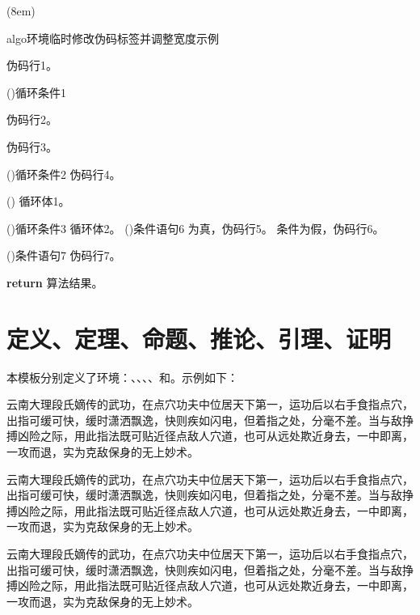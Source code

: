 \documentclass[print, doctor, vlined]{DissertUESTC}
\begin{document}
	\begin{algo}[!h](8em)
		\renewcommand{\algorithmcfname}{过程}  %
		\caption{algo环境临时修改伪码标签并调整宽度示例} \label{alg: algo环境修改伪码标签并调整宽度示例}
		伪码行1。
		
		\For(){循环条件1}{
			伪码行2。
			
			伪码行3。
			
			\DoWhile(){循环条件2}{
				伪码行4。
			}
			
			\Loop(){
				循环体1。
			}
			
			\Repeat(){循环条件3}{
				循环体2。
			}
			\eIf(){条件语句6}{
				为真，伪码行5。
			}{
				条件为假，伪码行6。
			}
			
			\If(){条件语句7}{
				伪码行7。
			}
		}
		\textbf{return} 算法结果。
	\end{algo}
	
	\clearpage
	\section{定义、定理、命题、推论、引理、证明}
	
	本模板分别定义了环境：、、、、和。示例如下：
	
	\begin{definition}
		云南大理段氏嫡传的武功，在点穴功夫中位居天下第一，运功后以右手食指点穴，出指可缓可快，缓时潇洒飘逸，快则疾如闪电，但着指之处，分毫不差。当与敌挣搏凶险之际，用此指法既可贴近径点敌人穴道，也可从远处欺近身去，一中即离，一攻而退，实为克敌保身的无上妙术。
	\end{definition}
	
	\begin{theorem}
		云南大理段氏嫡传的武功，在点穴功夫中位居天下第一，运功后以右手食指点穴，出指可缓可快，缓时潇洒飘逸，快则疾如闪电，但着指之处，分毫不差。当与敌挣搏凶险之际，用此指法既可贴近径点敌人穴道，也可从远处欺近身去，一中即离，一攻而退，实为克敌保身的无上妙术。
	\end{theorem}
	
	\begin{proposition}
		云南大理段氏嫡传的武功，在点穴功夫中位居天下第一，运功后以右手食指点穴，出指可缓可快，缓时潇洒飘逸，快则疾如闪电，但着指之处，分毫不差。当与敌挣搏凶险之际，用此指法既可贴近径点敌人穴道，也可从远处欺近身去，一中即离，一攻而退，实为克敌保身的无上妙术。
	\end{proposition}
	
\end{document}
